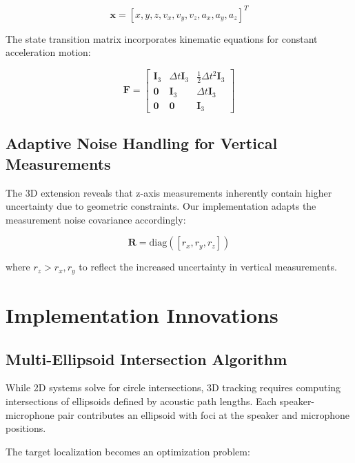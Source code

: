\documentclass[a4paper]{article}
\begin{document}
\begin{equation}
\mathbf{x} = [x, y, z, v_x, v_y, v_z, a_x, a_y, a_z]^T
\label{eq:state_vector}
\end{equation}

The state transition matrix incorporates kinematic equations for constant acceleration motion:

\begin{equation}
\mathbf{F} = \begin{bmatrix}
\mathbf{I}_3 & \Delta t \mathbf{I}_3 & \frac{1}{2}\Delta t^2 \mathbf{I}_3 \\
\mathbf{0} & \mathbf{I}_3 & \Delta t \mathbf{I}_3 \\
\mathbf{0} & \mathbf{0} & \mathbf{I}_3
\end{bmatrix}
\label{eq:transition_matrix}
\end{equation}

\subsection{Adaptive Noise Handling for Vertical Measurements}

The 3D extension reveals that z-axis measurements inherently contain higher uncertainty due to geometric constraints. Our implementation adapts the measurement noise covariance accordingly:

\begin{equation}
\mathbf{R} = \text{diag}([r_x, r_y, r_z])
\label{eq:measurement_noise}
\end{equation}

where $r_z > r_x, r_y$ to reflect the increased uncertainty in vertical measurements.

\section{Implementation Innovations}

\subsection{Multi-Ellipsoid Intersection Algorithm}

While 2D systems solve for circle intersections, 3D tracking requires computing intersections of ellipsoids defined by acoustic path lengths. Each speaker-microphone pair contributes an ellipsoid with foci at the speaker and microphone positions.

The target localization becomes an optimization problem:
\end{document}
